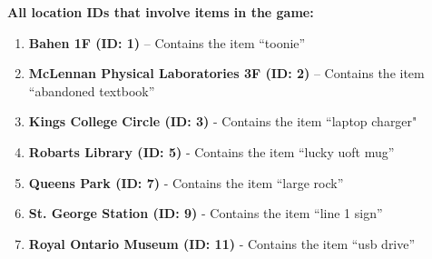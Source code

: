 \documentclass[11pt]{article}
\begin{document}
\textbf{All location IDs that involve items in the game:\\}
\begin{enumerate}
    \item \textbf{Bahen 1F (ID: 1)} – Contains the item ``toonie''
    \item \textbf{McLennan Physical Laboratories 3F (ID: 2)} – Contains the item ``abandoned textbook''
    \item \textbf{Kings College Circle (ID: 3)} - Contains the item ``laptop charger"
    \item \textbf{Robarts Library (ID: 5)} - Contains the item ``lucky uoft mug''
    \item \textbf{Queens Park (ID: 7)} - Contains the item ``large rock''
    \item \textbf{St. George Station (ID: 9)} - Contains the item ``line 1 sign''
    \item \textbf{Royal Ontario Museum (ID: 11)} - Contains the item ``usb drive''\\
\end{enumerate}
\end{document}
